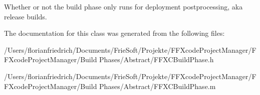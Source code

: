 Whether or not the build phase only runs for deployment postprocessing, aka release builds. 

The documentation for this class was generated from the following files\-:\begin{DoxyCompactItemize}
\item 
/\-Users/florianfriedrich/\-Documents/\-Frie\-Soft/\-Projekte/\-F\-F\-Xcode\-Project\-Manager/\-F\-F\-Xcode\-Project\-Manager/\-Build Phases/\-Abstract/F\-F\-X\-C\-Build\-Phase.\-h\item 
/\-Users/florianfriedrich/\-Documents/\-Frie\-Soft/\-Projekte/\-F\-F\-Xcode\-Project\-Manager/\-F\-F\-Xcode\-Project\-Manager/\-Build Phases/\-Abstract/F\-F\-X\-C\-Build\-Phase.\-m\end{DoxyCompactItemize}
